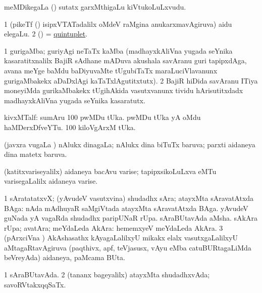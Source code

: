 \bentry
{}
\gl{\nA}
\bmng
meMDikegaLa () sutatx garxMthigaLu kiVtukoLuLxvudu. 
\emng
\eentry

\bentry
{}
\gl{\nA}
\bmng
\bnum
\num{1} (pikeTf () isipxVTATadalilx oMdeV raMgina anukarxmavAgiruva) aidu elegaLu. 
\num{2} (\ame) = \hyperlink{quintuplet}{quintuplet}. 
\enum
\emng
\eentry

\bentry
{}
\gl{\nA}
\expl{(\ca)}
\bmng
\bnum
\num{1} gurigaMba; guriyAgi neTaTx kaMba (madhayxkAliVna yugada seYnika kasaratitxnalilx BajiR sAdhane mADuva akushala savAranu guri tapipxdAga, avana meYge baMdu baDiyuvaMte tUgubiTaTx maraLuciVlavanunx gurigaMbakekx aDaDxlAgi kaTaTxlAgutitxtutx). 
\num{2} BajiR hiDida savAranu ITiya moneyiMda gurikaMbakekx tUgihAkida vasutxvanunx tividu hArisutitxdadx madhayxkAliVna yugada seYnika kasaratutx.  
\enum
\emng
\eentry

\bentry
{}
\gl{\nA}
\bmng
kivxMTalf: 
\banum
{} sumAru {\rm 100} pwMDu tUka. 
  pwMDu tUka yA oMdu haMDerxDfveYTu. 
 {\rm 100} kiloVgArxM tUka. 
\eanum
\emng
\eentry

\bentry
{}
\gl{\gu}
\bmng
(javxra \mo vugaLa \vi) nAlukx dinagaLa; nAlukx dina biTuTx baruva; parxti aidaneya dina matetx baruva. 
\emng
\eentry

\bentry
{}
\gl{\nA}
\bmng
(katitxvariseyalilx) aidaneya bacAvu varise; tapipxsikoLuLxva eMTu varisegaLalilx aidaneya varise. 
\emng
\eentry

\bentry
{}
\gl{\nA}
\bmng
\bnum
\num{1} sAratatatxvX; (yAvudeV vasutxvina) shudadhx sAra; atayxMta sAravatAtxda BAga:  nAda mAdhuyaR saMgiVtada atayxMta sAravatAtxda BAga. 
 yAvudeV guNada yA vagaRda 
\banum
{} shudadhx paripUNaR rUpa. 
 sAraBUtavAda aMsha. 
 sAkAra rUpa; avatAra; meYdaLeda AkAra:  hememxyeV meYdaLeda AkAra. 
\eanum
\numie
\num{3} (pArxciVna \tashA) AkAshasathx kAyagaLalilxyU mikakx elalx vasutxgaLalilxyU aMtagaRtavAgiruva (paqthivx, apf, teVjasusx, vAyu eMba catuBURtagaLiMda beVreyAda) aidaneya, paMcama BUta. 
\enum
\emng
\eentry

\bentry
{}
\gl{\gu}
\bmng
\bnum
\num{1} sAraBUtavAda. 
\num{2} (tananx bageyalilx) atayxMta shudadhxvAda; savoRVtakxqqSaTx. 
\enum
\emng
\eentry

